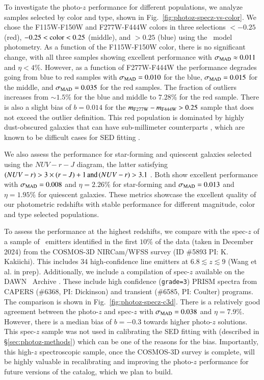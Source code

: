 \documentclass[longauth]{aa}
\begin{document}
To investigate the photo-$z$ performance for different populations, we analyze samples selected by color and type, shown in Fig.~\ref{fig:photoz-specz-vs-color}. We chose the F115W-F150W and F277W-F444W colors in three selections $<-0.25$ (red), $-0.25 < {\rm color} <0.25$ (middle), and $>0.25$ (blue) using the \SEpp\ model photometry. As a function of the F115W-F150W color, there is no significant change, with all three samples showing excellent performance with $\sigma_{\rm MAD} \approx 0.011$ and $\eta<4\%$. However, as a function of F277W-F444W the performance degrades going from blue to red samples with $\sigma_{\rm MAD} = 0.010$ for the blue, $\sigma_{\rm MAD} = 0.015$ for the middle, and $\sigma_{\rm MAD} = 0.035$ for the red samples. The fraction of outliers increases from $\sim1.5\%$ for the blue and middle to $7.28\%$ for the red sample. There is also a slight bias of $b=0.014$ for the $m_{\rm F277W} - m_{\rm F444W} > 0.25$ sample that does not exceed the outlier definition. This red population is dominated by highly dust-obscured galaxies that can have sub-millimeter counterparts \citep[e.g.,][]{Barrufet2023, Gottumukkala2023}, which are known to be difficult cases for SED fitting \citep[e.g.,][]{Casey2012, Hayward2015}. 

We also assess the performance for star-forming and quiescent galaxies selected using the $NUV-r-J$ diagram, the latter satisfying $(NUV - r) > 3\times(r - J) + 1 \, {\rm and} \, (NUV - r) > 3.1$ \citep{ilbert_mass_2013}. Both show excellent performance with $\sigma_{\rm MAD} = 0.008$ and $\eta = 2.26\%$ for star-forming and $\sigma_{\rm MAD} = 0.013$ and $\eta=1.95 \%$ for quiescent galaxies. These metrics showcase the excellent quality of our photometric redshifts with stable performance for different magnitude, color and type selected populations.


To assess the performance at the highest redshifts, we compare with the spec-$z$ of a sample of \oiii\ emitters identified in the first $10\%$ of the data (taken in December 2024) from the COSMOS-3D NIRCam/WFSS survey (ID \#5893 PI: K. Kakiichi). This includes 34 high-confidence line emitters at $6.8 \lesssim z \lesssim9$ (Wang et al. in prep). 
Additionally, we include a compilation of spec-$z$ available on the DAWN \JWST\ Archive \citep[DJA\footnote{\url{https://dawn-cph.github.io/dja/index.html}, \url{10.5281/zenodo.7299500}.},][]{Heintz2024}. These include high confidence (\texttt{grade=3}) PRISM spectra from CAPERS (\#6368, PI: Dickinson) and transient (\#6585, PI: Coulter) programs.
The comparison is shown in Fig.~\ref{fig:photoz-specz-c3d}. There is a relatively good agreement between the photo-$z$ and spec-$z$ with $\sigma_{\rm MAD} = 0.038$ and $\eta = 7.9\%$. However, there is a median bias of $b=-0.3$ towards higher photo-$z$ solutions. This spec-$z$ sample was not used in calibrating the SED fitting with \lephare{} (described in \S\ref{sec:photoz-methods}) which can be one of the reasons for the bias.  Importantly, this high-$z$ spectroscopic sample, once the COSMOS-3D survey is complete, will be highly valuable in recalibrating and improving the photo-$z$ performance for future versions of the catalog, which we plan to build.
\end{document}
